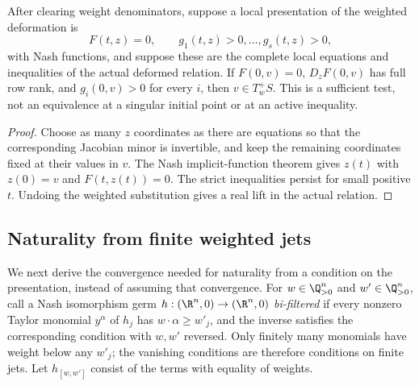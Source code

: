 \begin{proposition}\label{prop:v101-lift}
After clearing weight denominators, suppose a local presentation of the
weighted deformation is
\[
 F(t,z)=0,\qquad g_1(t,z)>0,\ldots,g_s(t,z)>0,
\]
with Nash functions, and suppose these are the complete local equations
and inequalities of the actual deformed relation. If $F(0,v)=0$,
$D_zF(0,v)$ has full row rank, and $g_i(0,v)>0$ for every $i$, then
$v\in T_w^+S$. This is a sufficient test, not an equivalence at a
singular initial point or at an active inequality.
\end{proposition}
\begin{proof}
Choose as many $z$ coordinates as there are equations so that the
corresponding Jacobian minor is invertible, and keep the remaining
coordinates fixed at their values in $v$. The Nash implicit-function
theorem gives $z(t)$ with $z(0)=v$ and $F(t,z(t))=0$.
The strict inequalities persist for small positive $t$. Undoing the
weighted substitution gives a real lift in the actual relation.
\end{proof}

\subsection{Naturality from finite weighted jets}
We next derive the convergence needed for naturality from a condition
on the presentation, instead of assuming that convergence. For
$w\in\Q_{>0}^n$ and $w'\in\Q_{>0}^n$, call a Nash isomorphism germ
$h:(\R^n,0)\to(\R^n,0)$ \emph{bi-filtered} if every nonzero Taylor
monomial $y^\alpha$ of $h_j$ has $w\cdot\alpha\ge w'_j$, and the
inverse satisfies the corresponding condition with $w,w'$ reversed.
Only finitely many monomials have weight below any $w'_j$; the
vanishing conditions are therefore conditions on finite jets.
Let $h_{[w,w']}$ consist of the terms with equality of weights.

